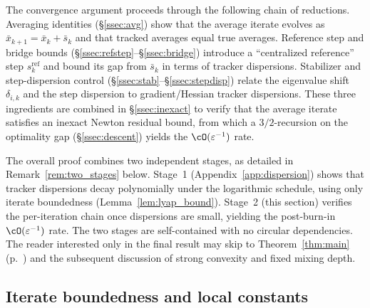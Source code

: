 \documentclass[review,onefignum,onetabnum]{siamart171218}
\begin{document}
The convergence argument proceeds through the following chain of
reductions.
Averaging identities (\S\ref{ssec:avg}) show that the average iterate evolves as
$\bar x_{k+1}=\bar x_k+\bar s_k$ and that tracked averages
equal true averages.
Reference step and bridge bounds
(\S\ref{ssec:refstep}--\S\ref{ssec:bridge}) introduce a
``centralized reference'' step $s_k^{\mathrm{ref}}$ and bound
its gap from $\bar s_k$ in terms of tracker dispersions.
Stabilizer and step-dispersion control
(\S\ref{ssec:stab}--\S\ref{ssec:stepdisp}) relate the
eigenvalue shift $\delta_{i,k}$ and the step dispersion to
gradient/Hessian tracker dispersions.
These three ingredients are combined in \S\ref{ssec:inexact}
to verify that the
average iterate satisfies an inexact Newton residual bound,
from which a $3/2$-recursion on the
optimality gap (\S\ref{ssec:descent}) yields the $\cO(\varepsilon^{-1})$ rate.

The overall proof combines two independent stages, as detailed
in Remark~\ref{rem:two_stages} below.
Stage~1 (Appendix~\ref{app:dispersion}) shows that tracker
dispersions decay polynomially under the logarithmic schedule,
using only iterate boundedness (Lemma~\ref{lem:lyap_bound}).
Stage~2 (this section) verifies the per-iteration chain
once dispersions are small, yielding the post-burn-in
$\cO(\varepsilon^{-1})$ rate.
The two stages are self-contained with no circular dependencies.
The reader interested only in the final result may skip to
Theorem~\ref{thm:main} (p.~\pageref{thm:main}) and the subsequent
discussion of strong convexity and fixed mixing depth.

\subsection{Iterate boundedness and local constants}\label{ssec:iterate_bound}
\end{document}
